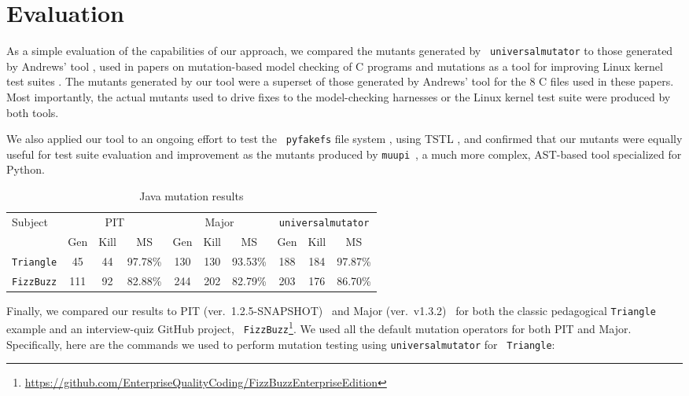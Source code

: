 \section{Evaluation}

As a simple evaluation of the capabilities of our approach, we compared the mutants generated by {\tt
  universalmutator} to those generated by Andrews' tool \cite{mutant},
used in papers on mutation-based model checking of C programs
\cite{ASE15} and mutations as a tool for improving Linux kernel test
suites \cite{mutation17}.  The mutants generated by our tool were a
superset of those generated by Andrews' tool for the 8 C files used in
these papers.  Most importantly, the actual mutants used to drive
fixes to the model-checking harnesses or the Linux kernel test suite
were produced by both tools.

We also applied our tool to an ongoing effort to test the {\tt
  pyfakefs} file system \cite{pyfakefs}, using TSTL \cite{nfm15,tstlsttt},
and confirmed that our mutants were equally useful for test suite
evaluation and improvement as the mutants produced by {\tt muupi}~\cite{muupi},
a much more complex, AST-based tool specialized for Python.
\begin{table}[t!]
  \scriptsize
  \caption{\label{tab:java} Java mutation results}
  \begin{tabular}{|l|ccc|ccc|ccc|}
    \hline
    Subject&\multicolumn{3}{c|}{PIT}&\multicolumn{3}{c|}{Major}&\multicolumn{3}{c|}{{\tt universalmutator}}\\
    &Gen&Kill&MS&Gen&Kill&MS&Gen&Kill&MS\\\hline
\hline
    {\tt Triangle}&45&44&97.78\%&130&130&93.53\%&188&184&97.87\%\\
{\tt FizzBuzz}&111&92&82.88\%&244&202&82.79\%&203&176&86.70\%\\
  \hline\end{tabular}
  \end{table}

Finally, we compared our results to PIT (ver.\ 1.2.5-SNAPSHOT)~\cite{pittest}
and Major (ver.\ v1.3.2)~\cite{major} for both the
classic pedagogical {\tt Triangle} example and an interview-quiz GitHub project, {\tt
  FizzBuzz}\footnote{\url{https://github.com/EnterpriseQualityCoding/FizzBuzzEnterpriseEdition}
}.  We used all the default mutation operators for both
PIT and Major. Specifically, here are the commands we used to
perform mutation testing using {\tt universalmutator} for {\tt
  Triangle}:

